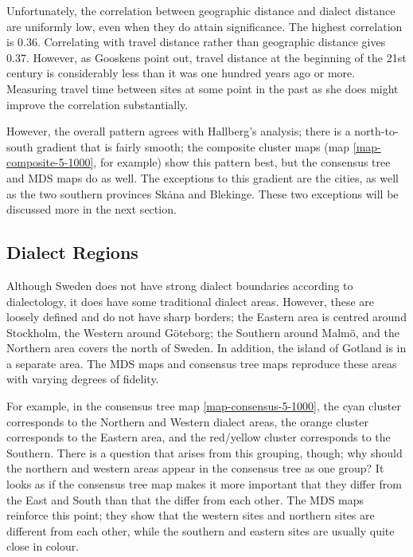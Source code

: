 Unfortunately, the correlation between geographic distance and dialect
distance are uniformly low, even when they do attain significance. The
highest correlation is 0.36. Correlating with travel distance rather
than geographic distance gives 0.37. However, as Gooskens point out, travel
distance at the beginning of the 21st century is considerably less
than it was one hundred years ago or more. Measuring travel time
between sites at some point in the past as she does might improve the
correlation substantially.

However, the overall pattern agrees with Hallberg's analysis; there is
a north-to-south gradient that is fairly smooth; the composite cluster
maps (map \ref{map-composite-5-1000}, for example) show this pattern
best, but the consensus tree and MDS maps do as well. The exceptions
to this gradient are the cities, as well as the two southern provinces
Sk\.ana and Blekinge. These two exceptions will be discussed more in
the next section.

\subsection{Dialect Regions}

Although Sweden does not have strong dialect boundaries according to
dialectology, it does have some traditional dialect areas. However,
these are loosely defined and do not have sharp borders; the Eastern
area is centred around Stockholm, the Western around G\"oteborg; the
Southern around Malm\"o, and the Northern area covers the north of
Sweden. In addition, the island of Gotland is in a separate area. The
MDS maps and consensus tree maps reproduce these areas with varying
degrees of fidelity.

For example, in the consensus tree map \ref{map-consensus-5-1000}, the
cyan cluster corresponds to the Northern and Western dialect areas,
the orange cluster corresponds to the Eastern area, and the red/yellow
cluster corresponds to the Southern. There is a question that arises
from this grouping, though; why should the northern and western areas
appear in the consensus tree as one group? It looks as if the
consensus tree map makes it more important that they differ from the
East and South than that the differ from each other. The MDS maps
reinforce this point; they show that the western sites and northern sites
are different from each other, while the southern and eastern sites
are usually quite close in colour.

